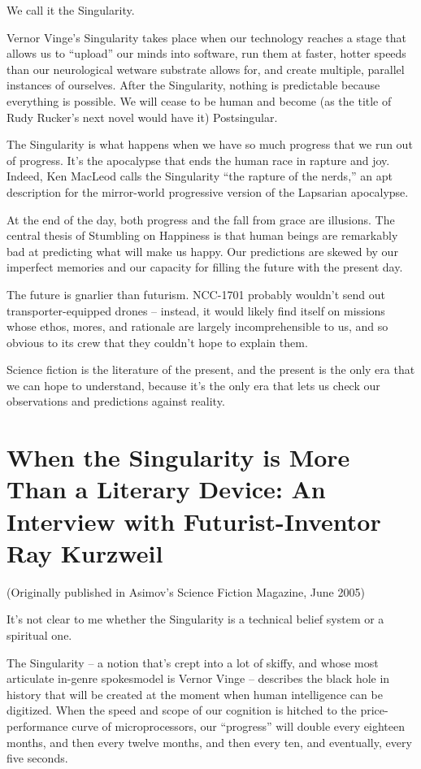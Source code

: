 We call it the Singularity.

Vernor Vinge's Singularity takes place when our technology reaches
a stage that allows us to ``upload'' our minds into software, run
them at faster, hotter speeds than our neurological wetware
substrate allows for, and create multiple, parallel instances of
ourselves. After the Singularity, nothing is predictable because
everything is possible. We will cease to be human and become (as
the title of Rudy Rucker's next novel would have it) Postsingular.

The Singularity is what happens when we have so much progress that
we run out of progress. It's the apocalypse that ends the human
race in rapture and joy. Indeed, Ken MacLeod calls the Singularity
``the rapture of the nerds,'' an apt description for the mirror-world
progressive version of the Lapsarian apocalypse.

At the end of the day, both progress and the fall from grace are
illusions. The central thesis of Stumbling on Happiness is that
human beings are remarkably bad at predicting what will make us
happy. Our predictions are skewed by our imperfect memories and our
capacity for filling the future with the present day.

The future is gnarlier than futurism. NCC-1701 probably wouldn't
send out transporter-equipped drones -- instead, it would likely
find itself on missions whose ethos, mores, and rationale are
largely incomprehensible to us, and so obvious to its crew that
they couldn't hope to explain them.

Science fiction is the literature of the present, and the present
is the only era that we can hope to understand, because it's the
only era that lets us check our observations and predictions
against reality.

\section{When the Singularity is More Than a Literary Device: An Interview with Futurist-Inventor Ray Kurzweil}

(Originally published in Asimov's Science Fiction Magazine, June
2005)

It's not clear to me whether the Singularity is a technical belief
system or a spiritual one.

The Singularity -- a notion that's crept into a lot of skiffy, and
whose most articulate in-genre spokesmodel is Vernor Vinge --
describes the black hole in history that will be created at the
moment when human intelligence can be digitized. When the speed and
scope of our cognition is hitched to the price-performance curve of
microprocessors, our ``progress'' will double every eighteen months,
and then every twelve months, and then every ten, and eventually,
every five seconds.

